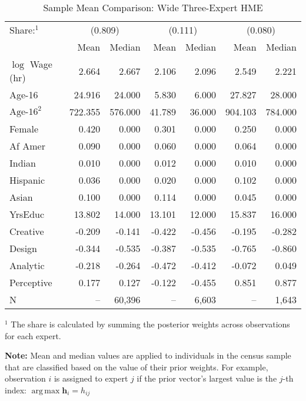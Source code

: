 \documentclass[12pt]{article}
\DeclareMathOperator*{\argmax}{arg\,max}
\theoremstyle{definition}
\begin{document}
  
  \begin{table} \centering
    \caption{Sample Mean Comparison: Wide Three-Expert HME}
    \begin{threeparttable}
      \begin{tabular}[l]{l r r r r r r}
    \cmidrule{1-7}
    Share:$^{1}$& \multicolumn{2}{c}{(0.809)} & \multicolumn{2}{c}{(0.111)} & \multicolumn{2}{c}{(0.080)} \\
                & Mean & Median & Mean & Median & Mean & Median \\
    \cmidrule{1-7}
    $\log$ Wage (hr)      &   2.664 &   2.667 &  2.106 &  2.096 &   2.549 &   2.221 \\
    Age-16                &  24.916 &  24.000 &  5.830 &  6.000 &  27.827 &  28.000 \\
    $\textrm{Age-16}^{2}$ & 722.355 & 576.000 & 41.789 & 36.000 & 904.103 & 784.000 \\
    Female                &   0.420 &   0.000 &  0.301 &  0.000 &   0.250 &   0.000 \\
    Af Amer               &   0.090 &   0.000 &  0.060 &  0.000 &   0.064 &   0.000 \\
    Indian                &   0.010 &   0.000 &  0.012 &  0.000 &   0.010 &   0.000 \\
    Hispanic              &   0.036 &   0.000 &  0.020 &  0.000 &   0.102 &   0.000 \\
    Asian                 &   0.100 &   0.000 &  0.114 &  0.000 &   0.045 &   0.000 \\
    YrsEduc               &  13.802 &  14.000 & 13.101 & 12.000 &  15.837 &  16.000 \\
    Creative              &  -0.209 &  -0.141 & -0.422 & -0.456 &  -0.195 &  -0.282 \\
    Design                &  -0.344 &  -0.535 & -0.387 & -0.535 &  -0.765 &  -0.860 \\
    Analytic              &  -0.218 &  -0.264 & -0.472 & -0.412 &  -0.072 &   0.049 \\
    Perceptive            &   0.177 &   0.127 & -0.122 & -0.455 &   0.851 &   0.877 \\
    \cmidrule{1-7}
    N                     &      -- &  60,396 &     -- &  6,603 &      -- &   1,643 \\
    \hline
      \end{tabular}
      \begin{tablenotes}
        \item{\footnotesize $^{1}$ The share is calculated by summing the 
        posterior weights across observations for each expert.}
        \item{\footnotesize \textbf{Note:} Mean and median values are applied to individuals in the census sample that are classified based on the value of their prior weights. For example, observation $i$ is assigned to expert $j$ if the prior vector's largest value is the $j$-th index: $\argmax \boldsymbol{h}_{i} = h_{ij}$}
      \end{tablenotes} \label{tbl:ME3_sample_comparison}
    \end{threeparttable}
  \end{table}
  
\end{document}
